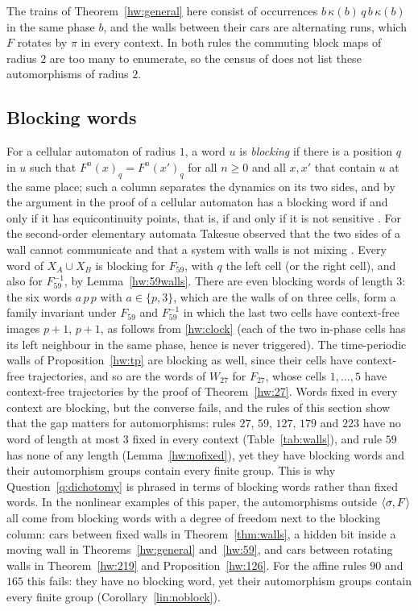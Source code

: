\begin{sloppypar}
The trains of Theorem~\ref{hw:general} here consist of occurrences $b\,\kappa(b)\,q\,b\,\kappa(b)$ in the same phase $b$, and the walls between their cars are alternating runs, which $F$ rotates by $\pi$ in every context. In both rules the commuting block maps of radius $2$ are too many to enumerate, so the census of \cite{PaperD} does not list these automorphisms of radius $2$.
\end{sloppypar}

\subsection{Blocking words}\label{hw:sec:kurka}

\begin{remark}\label{hw:kurka}
For a cellular automaton of radius $1$, a word $u$ is \emph{blocking} \cite{BT2000} if there is a position $q$ in $u$ such that $F^n(x)_q=F^n(x')_q$ for all $n\ge0$ and all $x,x'$ that contain $u$ at the same place; such a column separates the dynamics on its two sides, and by the argument in the proof of \cite[Theorem~3]{Kurka1997} a cellular automaton has a blocking word if and only if it has equicontinuity points, that is, if and only if it is not sensitive \cite[Corollary~2]{Kurka1997}. For the second-order elementary automata Takesue observed that the two sides of a wall cannot communicate and that a system with walls is not mixing \cite[Section~4]{Takesue1989}. Every word of $X_A\cup X_B$ is blocking for $F_{59}$, with $q$ the left cell (or the right cell), and also for $F_{59}^{-1}$, by Lemma~\ref{hw:59walls}. There are even blocking words of length $3$: the six words $a\,p\,p$ with $a\in\{p,3\}$, which are the walls of \cite[(4.3)]{Takesue1989} on three cells, form a family invariant under $F_{59}$ and $F_{59}^{-1}$ in which the last two cells have context-free images $p+1$, $p+1$, as follows from \eqref{hw:clock} (each of the two in-phase cells has its left neighbour in the same phase, hence is never triggered). The time-periodic walls of Proposition~\ref{hw:tp} are blocking as well, since their cells have context-free trajectories, and so are the words of $W_{27}$ for $F_{27}$, whose cells $1,\dots,5$ have context-free trajectories by the proof of Theorem~\ref{hw:27}. Words fixed in every context are blocking, but the converse fails, and the rules of this section show that the gap matters for automorphisms: rules $27$, $59$, $127$, $179$ and $223$ have no word of length at most $3$ fixed in every context (Table~\ref{tab:walls}), and rule $59$ has none of any length (Lemma~\ref{hw:nofixed}), yet they have blocking words and their automorphism groups contain every finite group. This is why Question~\ref{q:dichotomy} is phrased in terms of blocking words rather than fixed words. In the nonlinear examples of this paper, the automorphisms outside $\langle\sigma,F\rangle$ all come from blocking words with a degree of freedom next to the blocking column: cars between fixed walls in Theorem~\ref{thm:walls}, a hidden bit inside a moving wall in Theorems~\ref{hw:general} and~\ref{hw:59}, and cars between rotating walls in Theorem~\ref{hw:219} and Proposition~\ref{hw:126}. For the affine rules $90$ and $165$ this fails: they have no blocking word, yet their automorphism groups contain every finite group (Corollary~\ref{lin:noblock}).
\end{remark}
